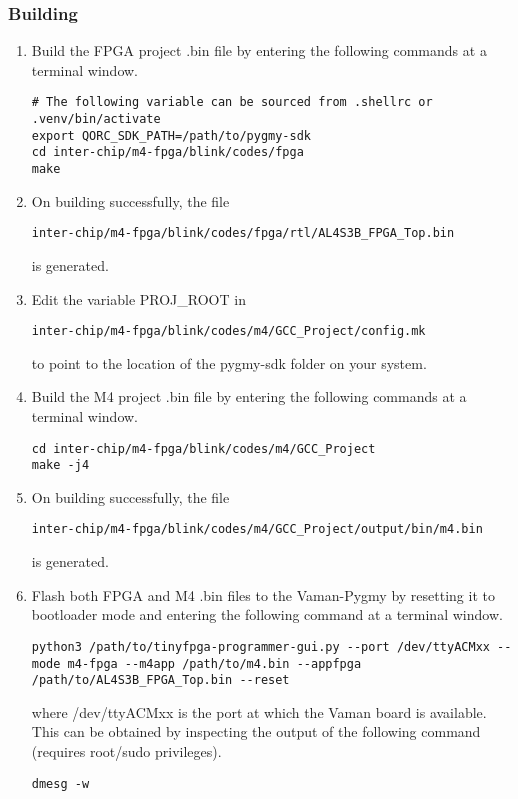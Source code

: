 \subsubsection{Building}
\begin{enumerate}
    \item Build the FPGA project .bin file by entering the following commands at
    a terminal window.
    \begin{lstlisting}
# The following variable can be sourced from .shellrc or .venv/bin/activate
export QORC_SDK_PATH=/path/to/pygmy-sdk
cd inter-chip/m4-fpga/blink/codes/fpga
make
    \end{lstlisting}
    \item On building successfully, the file
    \begin{lstlisting}
inter-chip/m4-fpga/blink/codes/fpga/rtl/AL4S3B_FPGA_Top.bin
    \end{lstlisting}
    is generated.
    \item Edit the variable PROJ\_ROOT in
    \begin{lstlisting}
inter-chip/m4-fpga/blink/codes/m4/GCC_Project/config.mk
    \end{lstlisting}
    to point to the location of the pygmy-sdk folder on your system.
    \item Build the M4 project .bin file by entering the following commands at a
    terminal window.
    \begin{lstlisting}
cd inter-chip/m4-fpga/blink/codes/m4/GCC_Project
make -j4
    \end{lstlisting}
    \item On building successfully, the file
    \begin{lstlisting}
inter-chip/m4-fpga/blink/codes/m4/GCC_Project/output/bin/m4.bin
    \end{lstlisting}
    is generated.
    \item Flash both FPGA and M4 .bin files to the Vaman-Pygmy by resetting it
    to bootloader mode and entering the following command at a terminal window.
    \begin{lstlisting}
python3 /path/to/tinyfpga-programmer-gui.py --port /dev/ttyACMxx --mode m4-fpga --m4app /path/to/m4.bin --appfpga /path/to/AL4S3B_FPGA_Top.bin --reset
    \end{lstlisting}
    where /dev/ttyACMxx is the port at which the Vaman board is available. This
    can be obtained by inspecting the output of the following command (requires
    root/sudo privileges).
    \begin{lstlisting}
dmesg -w
    \end{lstlisting}
\end{enumerate}

